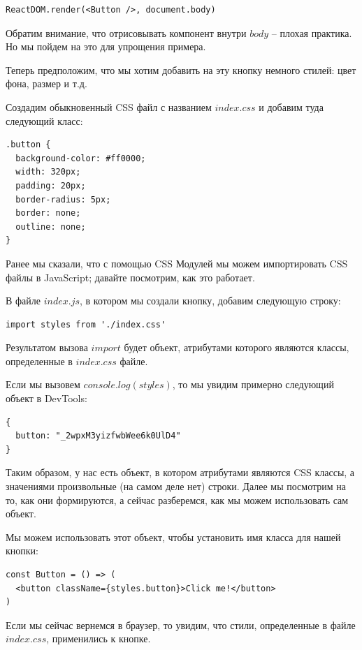 \begin{lstlisting}
ReactDOM.render(<Button />, document.body)
\end{lstlisting}

Обратим внимание, что отрисовывать компонент внутри $body$ -- плохая практика. Но мы пойдем на это для упрощения примера.

Теперь предположим, что мы хотим добавить на эту кнопку немного стилей: цвет фона, размер и т.д.

Создадим обыкновенный CSS файл с названием $index.css$ и добавим туда следующий класс:

\begin{lstlisting}
.button {
  background-color: #ff0000;
  width: 320px;
  padding: 20px;
  border-radius: 5px;
  border: none;
  outline: none;
}
\end{lstlisting}

Ранее мы сказали, что с помощью CSS Модулей мы можем импортировать CSS файлы в JavaScript; давайте посмотрим, как это работает.

В файле $index.js$, в котором мы создали кнопку, добавим следующую строку:

\begin{lstlisting}
import styles from './index.css'
\end{lstlisting}

Результатом вызова $import$ будет объект, атрибутами которого являются классы, определенные в $index.css$ файле.

Если мы вызовем $console.log (styles)$, то мы увидим примерно следующий объект в DevTools:

\begin{lstlisting}
{
  button: "_2wpxM3yizfwbWee6k0UlD4"
}
\end{lstlisting}

Таким образом, у нас есть объект, в котором атрибутами являются CSS классы, а значениями произвольные (на самом деле нет) строки. Далее мы посмотрим на то, как они формируются, а сейчас разберемся, как мы можем использовать сам объект.

Мы можем использовать этот объект, чтобы установить имя класса для нашей кнопки:

\begin{lstlisting}
const Button = () => (
  <button className={styles.button}>Click me!</button>
)
\end{lstlisting}

Если мы сейчас вернемся в браузер, то увидим, что стили, определенные в файле $index.css$, применились к кнопке.

